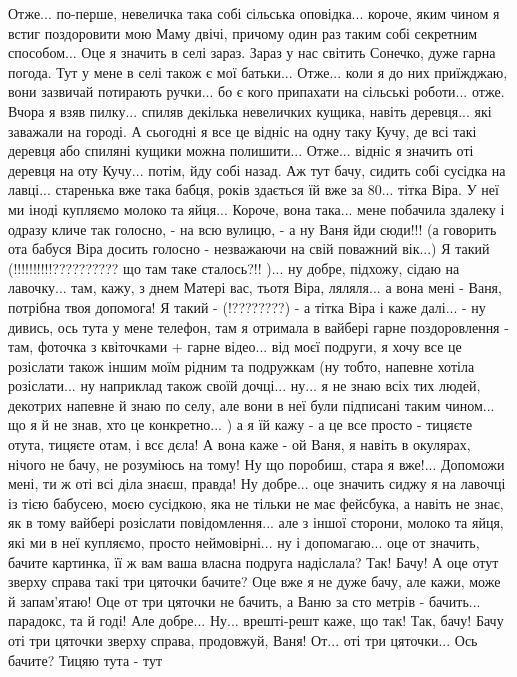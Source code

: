 Отже... по-перше,
невеличка така собі сільська оповідка...  короче, яким чином я встиг
поздоровити мою Маму двічі, причому один раз таким собі секретним способом...
Оце я значить в селі зараз. Зараз у нас світить Сонечко, дуже гарна погода. Тут
у мене в селі також є мої батьки...  Отже... коли я до них приїжджаю, вони
зазвичай потирають ручки... бо є кого припахати на сільські роботи... отже.
Вчора я взяв пилку...  спиляв декілька невеличких кущика, навіть деревця... які
заважали на городі. А сьогодні я все це відніс на одну таку Кучу, де всі такі
деревця або спиляні кущики можна полишити...  Отже... відніс я значить оті
деревця на оту Кучу...  потім, йду собі назад. Аж тут бачу, сидить собі сусідка
на лавці... старенька вже така бабця, років здається їй вже за 80... тітка
Віра. У неї ми іноді купляємо молоко та яйця... Короче, вона така... мене
побачила здалеку і одразу кличе так голосно, - на всю вулицю, - а ну Ваня йди
сюди!!! (а говорить ота бабуся Віра досить голосно - незважаючи на свій
поважний вік...) Я такий (!!!!!!!!!!?????????? що там таке сталось?!! )...  ну
добре, підхожу, сідаю на лавочку... там, кажу, з днем Матері вас, тьотя Віра,
ляляля... а вона мені - Ваня, потрібна твоя допомога! Я такий - (!????????) - а
тітка Віра і каже далі... - ну дивись, ось тута у мене телефон, там я отримала
в вайбері гарне поздоровлення - там, фоточка з квіточками + гарне відео... від
моєї подруги, я хочу все це розіслати також іншим моїм рідним та подружкам (ну
тобто, напевне хотіла розіслати... ну наприклад також своїй дочці... ну... я не
знаю всіх тих людей, декотрих напевне й знаю по селу, але вони в неї були
підписані таким чином... що я й не знав, хто це конкретно... ) а я їй кажу - а
це все просто - тицяєте отута, тицяєте отам, і всє дєла! А вона каже - ой Ваня,
я навіть в окулярах, нічого не бачу, не розуміюсь на тому! Ну що поробиш, стара
я вже!...  Допоможи мені, ти ж оті всі діла знаєш, правда!  Ну добре... оце
значить сиджу я на лавочці із тією бабусею, моєю сусідкою, яка не тільки не має
фейсбука, а навіть не знає, як в тому вайбері розіслати повідомлення... але з
іншої сторони, молоко та яйця, які ми в неї купляємо, просто неймовірні...  ну
і допомагаю... оце от значить, бачите картинка, її ж вам ваша власна подруга
надіслала?  Так! Бачу! А оце отут зверху справа такі три цяточки бачите?  Оце
вже я не дуже бачу, але кажи, може й запам'ятаю! Оце от три цяточки не бачить,
а Ваню за сто метрів - бачить...  парадокс, та й годі!  Але добре... Ну...
врешті-решт каже, що так! Так, бачу!  Бачу оті три цяточки зверху справа,
продовжуй, Ваня!  От... оті три цяточки... Ось бачите? Тицяю тута - тут
